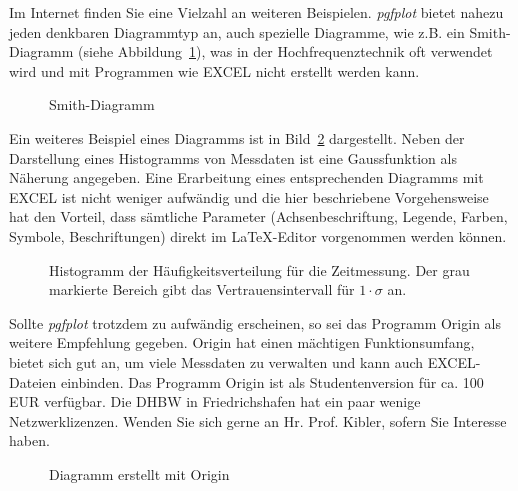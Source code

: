Im Internet finden Sie eine Vielzahl an weiteren Beispielen. \textit{pgfplot} bietet nahezu jeden denkbaren Diagrammtyp an, auch spezielle Diagramme, wie z.B. ein Smith-Diagramm (siehe Abbildung~\ref{fig:smith}), was in der Hochfrequenztechnik oft verwendet wird und mit Programmen wie EXCEL nicht erstellt werden kann.

\begin{figure}[hbt]
	\centering
\caption[Smith-Diagramm]{Smith-Diagramm}
\label{fig:smith}
\end{figure}

Ein weiteres Beispiel eines Diagramms ist in Bild~\ref{fig:historamm} dargestellt. Neben der Darstellung eines Histogramms von Messdaten ist eine Gaussfunktion als Näherung angegeben. Eine Erarbeitung eines entsprechenden Diagramms mit EXCEL ist nicht weniger aufwändig und die hier beschriebene Vorgehensweise hat den Vorteil, dass sämtliche Parameter (Achsenbeschriftung, Legende, Farben, Symbole, Beschriftungen) direkt im \LaTeX-Editor vorgenommen werden können.

\begin{figure}[hbt]
	\centering
%	
	\caption[Histogramm der Häufigkeitsverteilung für eine Zeitmessung]{Histogramm der Häufigkeitsverteilung für die Zeitmessung. Der grau markierte Bereich gibt das Vertrauensintervall für $1 \cdot \sigma $ an.}
	\label{fig:historamm}
\end{figure}

Sollte \textit{pgfplot} trotzdem zu aufwändig erscheinen, so sei das Programm Origin als weitere Empfehlung gegeben. Origin hat einen mächtigen Funktionsumfang, bietet sich gut an, um viele Messdaten zu verwalten und kann auch EXCEL-Dateien einbinden. Das Programm Origin ist als Studentenversion für ca. 100 EUR verfügbar. Die DHBW in Friedrichshafen hat ein paar wenige Netzwerklizenzen. Wenden Sie sich gerne an Hr. Prof. Kibler, sofern Sie Interesse haben.


\begin{figure}[hbt]
	\centering
	\caption{Diagramm erstellt mit Origin}
	\label{fig:origin}
\end{figure}


